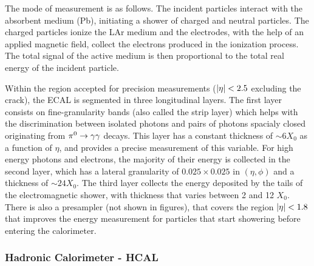 The mode of measurement is as follows. The incident particles interact with the absorbent medium (Pb), initiating a shower of charged and neutral particles. The charged particles ionize the \ac{LAr} medium and the electrodes, with the help of an applied magnetic field, collect the electrons produced in the ionization process. The total signal of the active medium is then proportional to the total real energy of the incident particle.

Within the region accepted for precision measurements (\(|\eta|<2.5\) excluding the crack), the \ac{ECAL} is segmented in three longitudinal layers.
The first layer consists on fine-granularity bands (also called the strip layer) which helps with the discrimination between isolated photons and pairs of photons spacialy closed originating from \(\pi^{0}\rightarrow\gamma\gamma\) decays. This layer has a constant thickness of \(\sim 6 X_0\) as a function of \(\eta\), and provides a precise measurement of this variable.
For high energy photons and electrons, the majority of their energy is collected in the second layer, which has a lateral granularity of \(0.025 \times 0.025\) in \((\eta, \phi)\) and a thickness of \(\sim 24 X_0\).
The third layer collects the energy deposited by the tails of the electromagnetic shower, with thickness that varies between 2 and 12 \(X_0\).
There is also a presampler (not shown in figures), that covers the region \(|\eta|<1.8\) that improves the energy measurement for particles that start showering before entering the calorimeter.




\subsubsection{Hadronic Calorimeter - HCAL}



